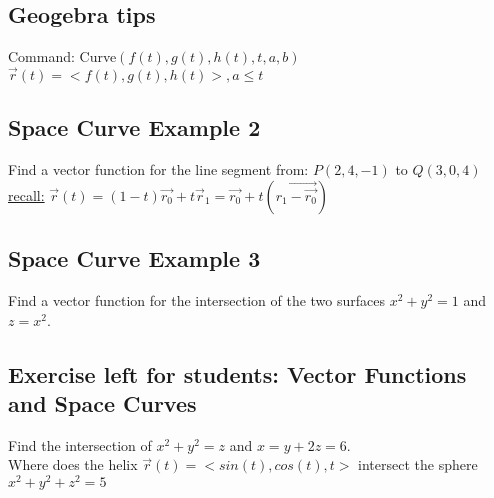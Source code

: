 \documentclass[12pt]{article}
\begin{document}
\subsection{Geogebra tips}
Command: Curve$(f(t),g(t),h(t),t,a,b)$\\%
$\vec{r} (t)=<f(t),g(t),h(t)>,a\leq t $
\subsection{Space Curve Example 2}
Find a vector function for the line segment from:
$P(2,4,-1) $ to $Q(3,0,4)$\\%
\underline{recall:} $\vec{r}(t)=(1-t)\vec{r_0} +t \vec{r} _1   =\vec{r_0} +t(\vec{r_1-\vec{r_0}  }    )$
\subsection{Space Curve Example 3}
Find a vector function for the intersection of the two surfaces $x^2+y^2=1$ and	$z=x^2$.
\subsection{Exercise left for students: Vector Functions and Space Curves}
Find the intersection of $x^2+y^2=z$ and $x=y+2z=6$.\\%
Where does the helix $\vec{r} (t) = <sin(t),cos(t),t> $ intersect the sphere $x^2+y^2+z^2=5$
\end{document}
